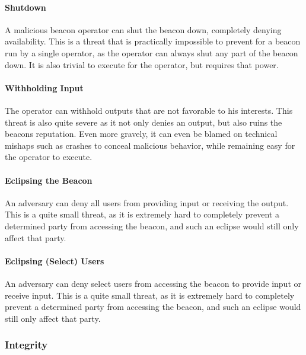\paragraph{Shutdown} A malicious beacon operator can shut the beacon down, completely denying availability. This is a threat that is practically impossible to prevent for a beacon run by a single operator, as the operator can always shut any part of the beacon down. It is also trivial to execute for the operator, but requires that power.
\paragraph{Withholding Input} The operator can withhold outputs that are not favorable to his interests. This threat is also quite severe as it not only denies an output, but also ruins the beacons reputation. Even more gravely, it can even be blamed on technical mishaps such as crashes to conceal malicious behavior, while remaining easy for the operator to execute.
\paragraph{Eclipsing the Beacon} An adversary can deny all users from providing input or receiving the output. This is a quite small threat, as it is extremely hard to completely prevent a determined party from accessing the beacon, and such an eclipse would still only affect that party.
\paragraph{Eclipsing (Select) Users} An adversary can deny select users from accessing the beacon to provide input or receive input. This is a quite small threat, as it is extremely hard to completely prevent a determined party from accessing the beacon, and such an eclipse would still only affect that party.


\subsubsection{Integrity}

